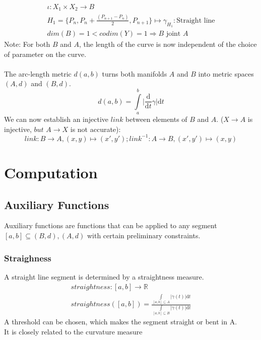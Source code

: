 \documentclass{article}
\begin{document}
\begin{align}
\iota: X_{1} \times X_{2} \rightarrow B\\
H_{1}=\{P_{n},P_{n}+\frac{(P_{n+1}-P_{n})}{2},P_{n+1}\} \mapsto \gamma_{H_{1}}: \text{Straight line}\\
dim(B)=1<codim(Y)=1 \Rightarrow B \text{ joint } A
\end{align}
Note: For both $B$ and $A$, the length of the curve is now independent of the choice of parameter on the curve. ~\cite[]{Taimanov}\\\\
The arc-length metric $d(a,b)$ turns both manifolds $A$ and $B$ into metric spaces $(A,d)$ and $(B,d)$.
\begin{equation}
d(a,b) = \int \limits _{a}^{b}\lvert \frac{\mathrm{d}}{\mathrm{d}t}\gamma\rvert \mathrm{d}t
\end{equation}
We can now establish an injective $link$ between elements of $B$ and $A$. ($X \rightarrow A$ is injective, $but$ $A \rightarrow X$ is not accurate):
\begin{equation}
link: B \rightarrow A, (x,y) \mapsto (x',y'); link^{-1}: A \rightarrow B, (x',y') \mapsto (x,y)
\end{equation}
\section{Computation}

\subsection{Auxiliary Functions}

Auxiliary functions are functions that can be applied to any segment $[a,b] \subseteq (B,d),(A,d)$ with certain preliminary constraints.

\subsubsection{Straighness}
A straight line segment is determined by a straightness measure.\\
\begin{align}
straightness: [a,b] \rightarrow \mathbb{R}\\
straightness([a,b])=\frac{\int \limits _{[a,b] \subseteq A}\lvert\gamma(t)\rvert\mathrm{d}t}{\int \limits _{[a,b] \subseteq B}\lvert\gamma(t)\rvert\mathrm{d}t}
\end{align}
A threshold can be chosen, which makes the segment straight or bent in A.\\
It is closely related to the curvature measure
\end{document}
